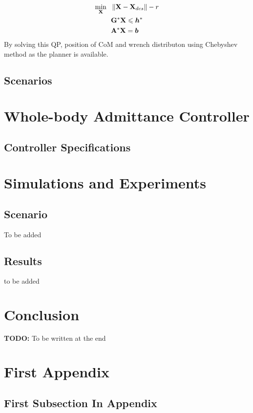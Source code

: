 \documentclass[letterpaper, 10pt, conference]{ieeeconf}
\newcommand{\TODO}[1]{{\color{red} {\bf TODO:} {#1}}}
\begin{document}
\begin{subequations}
	\begin{align}
	\min_{\mathbf{X}} \ \ &\left\lVert\mathbf{X}-\mathbf{X}_{des}\right\rVert-r \\
	 &\mathbf{G}^* \mathbf{X} \leqslant \bm{h}^* \\
	 &\mathbf{A}^* \mathbf{X} = \bm{b}
	\end{align}
\end{subequations}
By solving this QP, position of CoM and wrench distributon using Chebyshev method as the planner is available.

\subsection{Scenarios}

\section{Whole-body Admittance Controller} \label{Sec_WBQP}

\subsection{Controller Specifications}


\section{Simulations and Experiments} \label{Sec_Simulations_and_Experiments}

\subsection{Scenario}
To be added
\subsection{Results}
to be added
\section{Conclusion} \label{Sec_Conclusion}
\TODO{To be written at the end}




\appendices
\section{First Appendix} \label{FirstAppendix}
 \subsection{First Subsection In Appendix}
\end{document}
